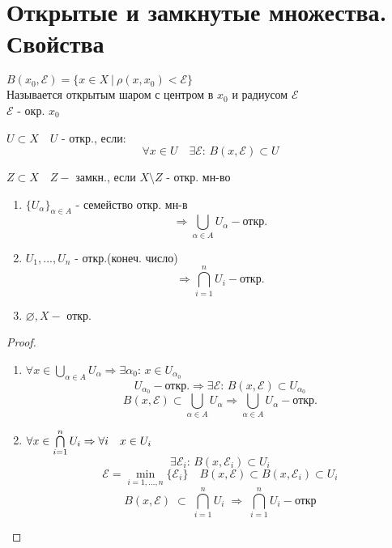 \documentclass[geometry.tex]{subfiles}
\begin{document}
  \section{Открытые и замкнутые множества. Свойства}

  \begin{definition}
      $B(x_0, \mathcal{E}) = \{x \in X \ | \ \rho(x, x_0) < \mathcal{E}\}$\\
      Называется открытым шаром с центром в $x_0$ и радиусом $\mathcal{E}$\\
      $\mathcal{E}$ - окр.  $x_0$
  \end{definition}

  \begin{definition}
      $U \subset X \quad U$ - откр., если:
      \[\forall x \in U \quad \exists \mathcal{E}\text{: } B(x, \mathcal{E}) \subset U\]
  \end{definition}

  \begin{definition}
      $Z \subset X \quad Z -$ замкн., если $X \setminus Z$ - откр. мн-во
  \end{definition}

  \begin{theorem}[св-ва откр. мн-в]
      \begin{enumerate}
          \item $\{ U_\alpha \}_{\alpha \in A}$ - семейство откр. мн-в
                 \[\Rightarrow \bigcup_{\alpha \in A}U_\alpha - \text{откр.}\]
          \item $U_1,...,U_n$ - откр.(конеч. число) \[\Rightarrow \bigcap_{i = 1}^n U_i - \text{откр.}\]
          \item $\varnothing, X - $ откр.
      \end{enumerate}
  \end{theorem}
  \begin{proof}
      \begin{enumerate}
          \item $\forall x \in \bigcup\limits_{\alpha \in A} U_\alpha \Rightarrow \exists \alpha_0\text{: } x \in U_{\alpha_0}$
                 \[U_{\alpha_0} - \text{откр.}\Rightarrow \exists \mathcal{E}\text{: } B(x, \mathcal{E}) \subset U_{\alpha_0}\]
                 \[B(x, \mathcal{E}) \subset \bigcup_{\alpha \in A} U_\alpha \Rightarrow
                 \bigcup_{\alpha \in A} U_\alpha - \text{откр.}\]
          \item $\forall x \in \bigcap\limits_{i = 1}^n U_i \Rightarrow \forall i \quad x \in U_i$
                \[\exists \mathcal{E}_i\text{: } B(x, \mathcal{E}_i) \subset U_i\]
                \[\mathcal{E} = \min_{i = 1,..., n}\{\mathcal{E}_i\} \quad B(x, \mathcal{E}) \subset B(x, \mathcal{E}_i) \subset U_i\]
                \[B(x, \mathcal{E}) \;\subset\; \bigcap\limits_{i=1}^n U_i\; \Rightarrow\; \bigcap\limits_{i = 1} ^ n U_i - \text{откр}\]
      \end{enumerate}
  \end{proof}
\end{document}
